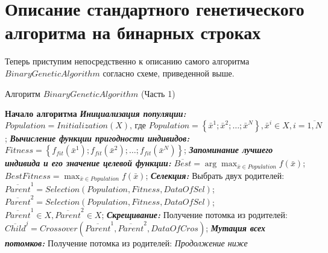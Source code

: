 \chapter{Описание стандартного генетического алгоритма на бинарных строках}\label{StandardGA:section_binaryGA}

Теперь приступим непосредственно к описанию самого алгоритма $ BinaryGeneticAlgorithm $ согласно схеме, приведенной выше.


\begin{algorithm}
\caption{Алгоритм $ BinaryGeneticAlgorithm $ (Часть 1)} \label{StandardGA:alg:BinaryGeneticAlgorithm}
\begin{algorithmic}
\State \textbf{Начало алгоритма}
\BeginBlock \textbf{\textit{Инициализация популяции:}}
\State $Population=Initialization\left( X\right) \text{, где } Population=\left\lbrace \bar{x}^1; \bar{x}^2; \ldots; \bar{x}^N \right\rbrace, \bar{x}^i \in X, i=\overline{1,N} $;
\EndBlock
\BeginBlock \textbf{\textit{Вычисление функции пригодности индивидов:}}
\State $Fitness=\left\lbrace f_{fit} \left( \bar{x}^1 \right); f_{fit} \left( \bar{x}^2 \right); \ldots; f_{fit} \left( \bar{x}^N \right) \right\rbrace $;
\EndBlock
\BeginBlock \textbf{\textit{Запоминание лучшего индивида и его значение целевой функции:}}
\State $\overline{Best}=\arg{ \max_{\bar{x} \in Population}{f\left ( \bar{x} \right )} }$;
\State $BestFitness=\max_{\bar{x} \in Population}{f\left ( \bar{x} \right )}$;
\EndBlock
{}
\BeginBlock \textbf{\textit{Селекция:}}
\State Выбрать двух родителей:
\State ${\overline{Parent}}^1=Selection\left( Population, Fitness, DataOfSel\right)$;
\State ${\overline{Parent}}^2=Selection\left( Population, Fitness, DataOfSel\right)$;
\State ${\overline{Parent}}^1\in X, {\overline{Parent}}^2\in X$;
\EndBlock
\BeginBlock \textbf{\textit{Скрещивание:}}
\State Получение потомка из родителей:
\State ${\overline{Child}}^j=Crossover\left({\overline{Parent}}^1,{\overline{Parent}}^2, DataOfCros\right)$;
\EndBlock
\EndFor
\BeginBlock \textbf{\textit{Мутация всех потомков:}}
\State Получение потомка из родителей:
\State \textit{Продолжение ниже}

\end{algorithmic}
\end{algorithm}
~\\


